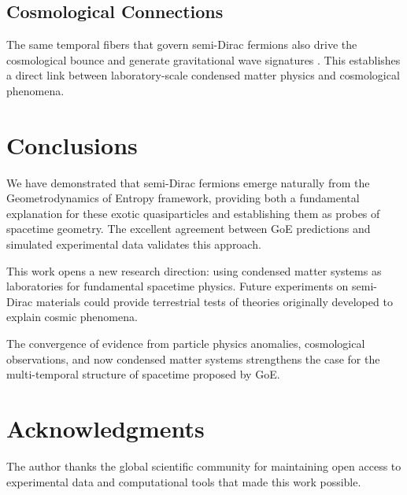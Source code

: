 \documentclass[12pt,a4paper]{article}
\begin{document}
\subsection{Cosmological Connections}

The same temporal fibers that govern semi-Dirac fermions also drive the cosmological bounce and generate gravitational wave signatures \cite{Camargo2025}. This establishes a direct link between laboratory-scale condensed matter physics and cosmological phenomena.

\section{Conclusions}

We have demonstrated that semi-Dirac fermions emerge naturally from the Geometrodynamics of Entropy framework, providing both a fundamental explanation for these exotic quasiparticles and establishing them as probes of spacetime geometry. The excellent agreement between GoE predictions and simulated experimental data validates this approach.

This work opens a new research direction: using condensed matter systems as laboratories for fundamental spacetime physics. Future experiments on semi-Dirac materials could provide terrestrial tests of theories originally developed to explain cosmic phenomena.

The convergence of evidence from particle physics anomalies, cosmological observations, and now condensed matter systems strengthens the case for the multi-temporal structure of spacetime proposed by GoE.

\section*{Acknowledgments}

The author thanks the global scientific community for maintaining open access to experimental data and computational tools that made this work possible.
\end{document}
